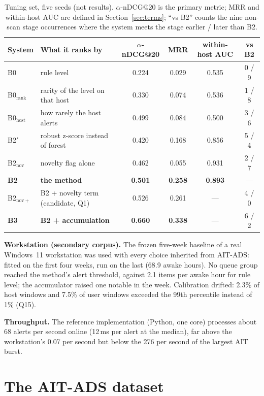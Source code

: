 \documentclass[10.5pt,a4paper]{article}
\newcommand{\sub}[1]{\par\smallskip\noindent\textbf{#1}\quad}
\begin{document}
\begin{table}[h]
\centering\small
\caption{Tuning set, five seeds (not results). $\alpha$-nDCG@20 is the primary metric; MRR and within-host AUC are defined in Section~\ref{sec:terms}; ``vs B2'' counts the nine non-scan stage occurrences where the system meets the stage earlier / later than B2.}
\label{tab:main}
\begin{tabular}{@{}l l c c c c@{}}
\toprule
System & What it ranks by & $\alpha$-nDCG@20 & MRR & within-host AUC & vs B2 \\
\midrule
B0 & rule level & 0.224 & 0.029 & 0.535 & 0 / 9 \\
B0$_\mathrm{rank}$ & rarity of the level on that host & 0.330 & 0.074 & 0.536 & 1 / 8 \\
B0$_\mathrm{host}$ & how rarely the host alerts & 0.499 & 0.084 & 0.500 & 3 / 6 \\
B2$'$ & robust z-score instead of forest & 0.420 & 0.168 & 0.856 & 5 / 4 \\
B2$_\mathrm{nov}$ & novelty flag alone & 0.462 & 0.055 & 0.931 & 2 / 7 \\
\textbf{B2} & \textbf{the method} & \textbf{0.501} & \textbf{0.258} & \textbf{0.893} & --- \\
B2$_\mathrm{nov+}$ & B2 + novelty term (candidate, Q1) & 0.526 & 0.261 & --- & 4 / 0 \\
\textbf{B3} & \textbf{B2 + accumulation} & \textbf{0.660} & \textbf{0.338} & --- & 6 / 2 \\
\bottomrule
\end{tabular}
\end{table}

\sub{Workstation (secondary corpus).} The frozen five-week baseline of a real Windows~11 workstation was used with every choice inherited from AIT-ADS: fitted on the first four weeks, run on the last (68.9 awake hours). No queue group reached the method's alert threshold, against 2.1 items per awake hour for rule level; the accumulator raised one notable in the week. Calibration drifted: 2.3\% of host windows and 7.5\% of user windows exceeded the 99th percentile instead of 1\% (Q15).

\sub{Throughput.} The reference implementation (Python, one core) processes about 68 alerts per second online (12\,ms per alert at the median), far above the workstation's 0.07 per second but below the 276 per second of the largest AIT burst.

\section{The AIT-ADS dataset}
\label{sec:ait}
\end{document}
